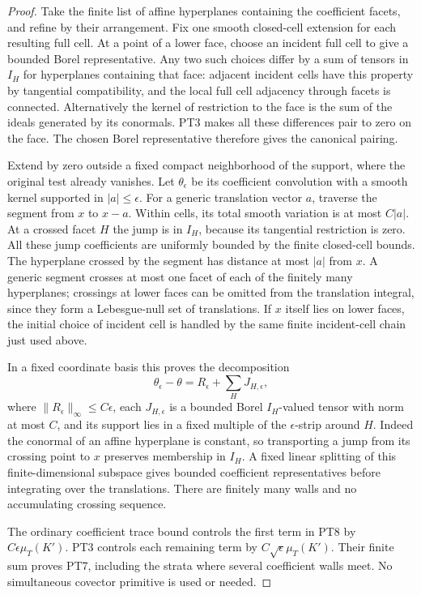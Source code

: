 \begin{proof}
Take the finite list of affine hyperplanes containing the
coefficient facets, and refine by their arrangement.  Fix
one smooth closed-cell extension for each resulting full
cell.  At a point of a lower face, choose an incident full
cell to give a bounded Borel representative.  Any two such
choices differ by a sum of tensors in $I_H$ for hyperplanes
containing that face: adjacent incident cells have this
property by tangential compatibility, and the local full
cell adjacency through facets is connected.  Alternatively
the kernel of restriction to the face is the sum of the
ideals generated by its conormals.  PT3 makes all these
differences pair to zero on the face.  The chosen Borel
representative therefore gives the canonical pairing.

Extend by zero outside a fixed compact neighborhood of the
support, where the original test already vanishes.  Let
$\theta_\epsilon$ be its coefficient convolution with a
smooth kernel supported in $|a|\le\epsilon$.
For a generic translation vector $a$, traverse the segment
from $x$ to $x-a$.  Within cells, its total smooth variation
is at most $C|a|$.  At a crossed facet $H$ the jump is in
$I_H$, because its tangential restriction is zero.  All
these jump coefficients are uniformly bounded by the finite
closed-cell bounds.  The hyperplane crossed by the segment
has distance at most $|a|$ from $x$.  A generic segment
crosses at most one facet of each of the finitely many
hyperplanes; crossings at lower faces can be omitted from
the translation integral, since they form a Lebesgue-null
set of translations.  If $x$ itself lies on lower faces,
the initial choice of incident cell is handled by the same
finite incident-cell chain just used above.

In a fixed coordinate basis this proves the decomposition
\[
       \theta_\epsilon-\theta
             =R_\epsilon+\sum_H J_{H,\epsilon},
 \tag{PT8}
\]
where $\|R_\epsilon\|_\infty\le C\epsilon$, each
$J_{H,\epsilon}$ is a bounded Borel $I_H$-valued tensor
with norm at most $C$, and its support lies in a fixed
multiple of the $\epsilon$-strip around $H$.  Indeed the
conormal of an affine hyperplane is constant, so transporting
a jump from its crossing point to $x$ preserves membership
in $I_H$.  A fixed linear splitting of this finite-dimensional
subspace gives bounded coefficient representatives before
integrating over the translations.  There are finitely many
walls and no accumulating crossing sequence.

The ordinary coefficient trace bound controls the first term
in PT8 by $C\epsilon\mu_T(K')$.  PT3 controls each remaining
term by $C\sqrt\epsilon\mu_T(K')$.  Their finite sum proves
PT7, including the strata where several coefficient walls
meet.  No simultaneous covector primitive is used or needed.
\end{proof}

